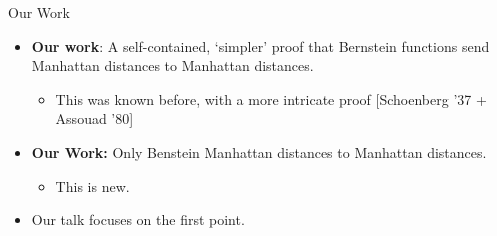 \begin{frame}{Our Work}
  \begin{itemize}[<+->]
  \item \textbf{Our work}: A self-contained, `simpler' proof that Bernstein
  functions send Manhattan distances to Manhattan distances.
      \vs
  \begin{itemize}[<+->]
    \item This was known before, with a more intricate proof
      [Schoenberg '37 + Assouad '80]
      \vs
  \end{itemize}
\item \textbf{Our Work:} Only Benstein Manhattan distances to Manhattan
    distances.
      \vs
  \begin{itemize}[<+->]
    \item This is new.
  \end{itemize}
      \vs
\item Our talk focuses on the first point.
  \end{itemize}
\end{frame}

